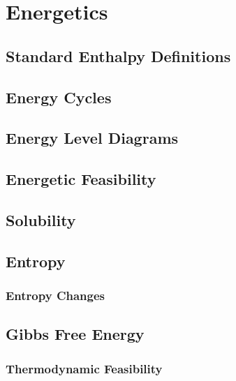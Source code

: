 \documentclass[../main]{subfiles}
\begin{document}
\section{Energetics}

\subsection{Standard Enthalpy Definitions}

\subsection{Energy Cycles}

\subsection{Energy Level Diagrams}

\subsection{Energetic Feasibility}

\subsection{Solubility}

\subsection{Entropy}

\subsubsection{Entropy Changes}

\subsection{Gibbs Free Energy}

\subsubsection{Thermodynamic Feasibility}
\end{document}
